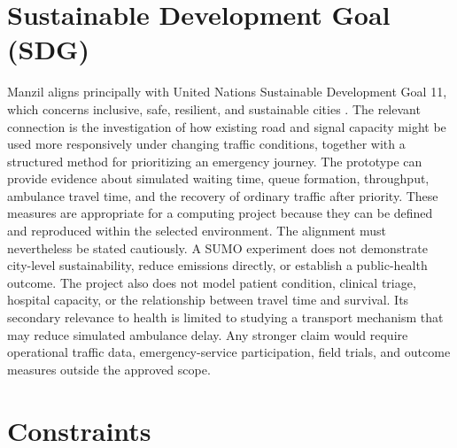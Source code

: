 \section{Sustainable Development Goal (SDG)}

Manzil aligns principally with United Nations Sustainable Development Goal 11, which concerns inclusive, safe, resilient, and sustainable cities \cite{un2025sdg}. The relevant connection is the investigation of how existing road and signal capacity might be used more responsively under changing traffic conditions, together with a structured method for prioritizing an emergency journey. The prototype can provide evidence about simulated waiting time, queue formation, throughput, ambulance travel time, and the recovery of ordinary traffic after priority. These measures are appropriate for a computing project because they can be defined and reproduced within the selected environment. The alignment must nevertheless be stated cautiously. A SUMO experiment does not demonstrate city-level sustainability, reduce emissions directly, or establish a public-health outcome. The project also does not model patient condition, clinical triage, hospital capacity, or the relationship between travel time and survival. Its secondary relevance to health is limited to studying a transport mechanism that may reduce simulated ambulance delay. Any stronger claim would require operational traffic data, emergency-service participation, field trials, and outcome measures outside the approved scope.

\section{Constraints}

